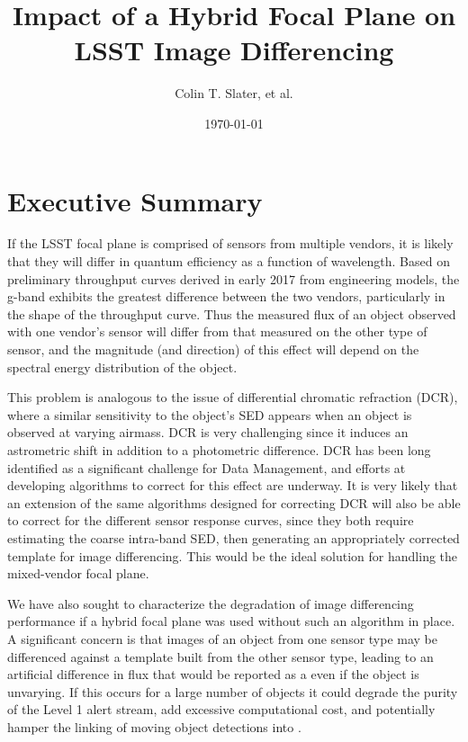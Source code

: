\documentclass[DM]{lsstdoc}
\title[Hybrid Focal Plane]{Impact of a Hybrid Focal Plane on LSST Image Differencing}
\author{Colin T. Slater, et al. }
\date{\today}
\begin{document}
\maketitle
{}


\section{Executive Summary}

If the LSST focal plane is comprised of sensors from multiple vendors, it is
likely that they will differ in quantum efficiency as a function of wavelength.
Based on preliminary throughput curves derived in early 2017 from engineering
models, the g-band exhibits the greatest difference between the two vendors,
particularly in the shape of the throughput curve. Thus the measured flux of an
object observed with one vendor's sensor will differ from that measured on the
other type of sensor, and the magnitude (and direction) of this effect will
depend on the spectral energy distribution of the object.

This problem is analogous to the issue of differential chromatic refraction (DCR),
where a similar sensitivity to the object's SED appears when an object is
observed at varying airmass. DCR is very challenging since it induces an
astrometric shift in addition to a photometric difference. DCR has been long
identified as a significant challenge for Data Management, and efforts at
developing algorithms to correct for this effect are underway. It is very likely
that an extension of the same algorithms designed for correcting DCR will also
be able to correct for the different sensor response curves, since they both
require estimating the coarse intra-band SED, then generating an appropriately
corrected template for image differencing. This would be the ideal solution for
handling the mixed-vendor focal plane.

We have also sought to characterize the degradation of image differencing
performance if a hybrid focal plane was used without such an algorithm in place.
A significant concern is that images of an object from one sensor type may be
differenced against a template built from the other sensor type, leading to an
artificial difference in flux that would be reported as a \DIASource even if the
object is unvarying. If this occurs for a large number of objects it could
degrade the purity of the Level 1 alert stream, add excessive computational
cost, and potentially hamper the linking of moving object detections into
\SSObjects.
\end{document}
